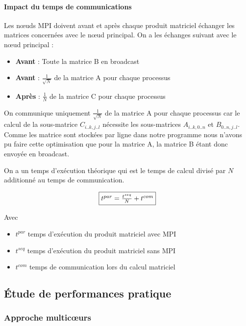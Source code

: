 \documentclass[11pt,a4paper]{article}
\begin{document}
			\paragraph{Impact du temps de communications}
				Les n\oe{}uds MPI doivent avant et après chaque produit matriciel échanger les matrices concernées avec le n\oe{}ud principal. On a les échanges suivant avec le n\oe{}ud principal :
				\begin{itemize}
					\item \textbf{Avant} : Toute la matrice B en broadcast
					\item \textbf{Avant} : $\frac{1}{\sqrt{N}}$ de la matrice A pour chaque processus
					\item \textbf{Après} : $\frac{1}{N}$ de la matrice C pour chaque processus
				\end{itemize}

				On communique uniquement $\frac{1}{\sqrt{N}}$ de la matrice A pour chaque processus car le calcul de la sous-matrice $C_{i..k,j..l}$ nécessite les sous-matrices $A_{i..k,0..n}$ et $B_{0..n,j..l}$. Comme les matrice sont stockées par ligne dans notre programme nous n'avons pu faire cette optimisation que pour la matrice A, la matrice B étant donc envoyée en broadcast.

			On a un temps d'exécution théorique qui est le temps de calcul divisé par $N$ additionné au temps de communication.

			$$
			\fbox{$t^{par} = \frac{t^{seq}}{N} + t^{com}$}
			$$

			Avec
			\begin{itemize}
				\item $t^{par}$ temps d'exécution du produit matriciel avec MPI
				\item $t^{seq}$ temps d'exécution du produit matriciel sans MPI
				\item $t^{com}$ temps de communication lors du calcul matriciel

			\end{itemize}
			

	\subsection{Étude de performances pratique}

		\subsubsection{Approche multic\oe{}urs}
		
\end{document}
